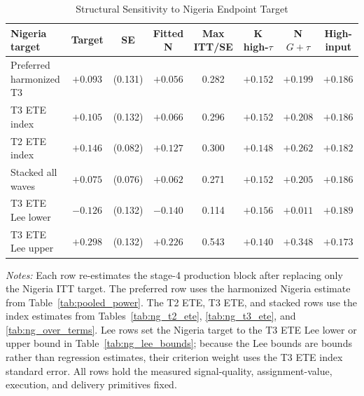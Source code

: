 \begin{table}[H]
\centering
\caption{Structural Sensitivity to Nigeria Endpoint Target}
\label{tab:struct_nigeria_endpoint_sensitivity}
\begin{threeparttable}
\scriptsize
\setlength{\tabcolsep}{3pt}
\begin{tabular}[t]{lccccccc}
\toprule
Nigeria target & Target & SE & Fitted N & Max ITT/SE & K high-$\tau$ & N $G+\tau$ & High-input \\
\midrule
Preferred harmonized T3 & $+0.093$ & (0.131) & $+0.056$ & 0.282 & $+0.152$ & $+0.199$ & $+0.186$ \\
T3 ETE index & $+0.105$ & (0.132) & $+0.066$ & 0.296 & $+0.152$ & $+0.208$ & $+0.186$ \\
T2 ETE index & $+0.146$ & (0.082) & $+0.127$ & 0.300 & $+0.148$ & $+0.262$ & $+0.182$ \\
Stacked all waves & $+0.075$ & (0.076) & $+0.062$ & 0.271 & $+0.152$ & $+0.205$ & $+0.186$ \\
T3 ETE Lee lower & $-0.126$ & (0.132) & $-0.140$ & 0.114 & $+0.156$ & $+0.011$ & $+0.189$ \\
T3 ETE Lee upper & $+0.298$ & (0.132) & $+0.226$ & 0.543 & $+0.140$ & $+0.348$ & $+0.173$ \\
\bottomrule
\end{tabular}
\begin{tablenotes}
\footnotesize
\item \textit{Notes:} Each row re-estimates the stage-4 production block after replacing only the Nigeria ITT target. The preferred row uses the harmonized Nigeria estimate from Table~\ref{tab:pooled_power}. The T2 ETE, T3 ETE, and stacked rows use the index estimates from Tables~\ref{tab:ng_t2_ete}, \ref{tab:ng_t3_ete}, and \ref{tab:ng_over_terms}. Lee rows set the Nigeria target to the T3 ETE Lee lower or upper bound in Table~\ref{tab:ng_lee_bounds}; because the Lee bounds are bounds rather than regression estimates, their criterion weight uses the T3 ETE index standard error. All rows hold the measured signal-quality, assignment-value, execution, and delivery primitives fixed.
\end{tablenotes}
\end{threeparttable}
\end{table}
